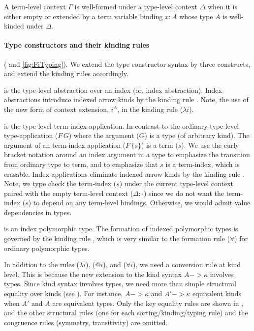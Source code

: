 A term-level context $\Gamma$ is well-formed under a type-level context
$\Delta$ when it is either empty or extended by a term variable binding
$x:A$ whose type $A$ is well-kinded under $\Delta$.

\paragraph{Type constructors and their kinding rules\!}( and \ref{fig:FiTyping}).\;
We extend the type constructor syntax by three constructs,
and extend the kinding rules accordingly.

 is the type-level abstraction over an index
(or, index abstraction). Index abstractions introduce indexed arrow kinds
by the kinding rule . Note, the use of the new form of
context extension, $i^A$, in the kinding rule ($\lambda i$).

 is the type-level term-index application. In contrast to
the ordinary type-level type-application ($F\,G$) where the argument ($G$) is
a type (of arbitrary kind). The argument of an term-index application ($F\,\{s\}$) is
a term ($s$). We use the curly bracket notation around an index argument
in a type to emphasize the transition from ordinary type to term, and
to emphasize that $s$ is a term-index, which is erasable. Index applications
eliminate indexed arrow kinds by the kinding rule .
Note, we type check
the term-index ($s$) under the current type-level context paired with
the empty term-level context ($\Delta;\cdot$) since we do not want
the term-index ($s$) to depend on any term-level bindings.
Otherwise, we would admit value dependencies in types.

 is an index polymorphic type.
The formation of indexed polymorphic types is governed by
the kinding rule , which is very similar to
the formation rule ($\forall$) for ordinary polymorphic types.

In addition to the rules ($\lambda i$), ($@ i$), and ($\forall i$),
we need a conversion rule  at kind level. This is because
the new extension to the kind syntax $A -> \kappa$ involves types.
Since kind syntax involves types, we need more than simple structural
equality over kinds (see ). For instance, $A -> \kappa$ and 
$A' -> \kappa$ equivalent kinds when $A'$ and $A$ are equivalent types.
Only the key equality rules are shown in , and the other
structural rules (one for each sorting/kinding/typing rule) and
the congruence rules (symmetry, transitivity) are omitted.

